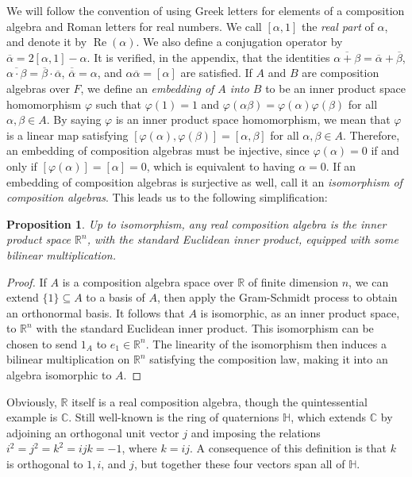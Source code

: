 \documentclass[10pt]{amsart}
\newcommand{\R}{\mathbb{R}}
\newcommand{\C}{\mathbb{C}}
\renewcommand{\H}{\mathbb{H}}
\DeclareMathOperator*{\re}{Re}
\renewcommand{\bar}{\overline}
\newcommand{\norm}[1]{\left[#1\right]}
\newtheorem{prop}[thm]{Proposition}
\begin{document}
We will follow the convention of using Greek letters for elements of a composition algebra and Roman letters for real numbers.  We call $\norm{\alpha,1}$ the \emph{real part} of $\alpha$, and denote it by $\re(\alpha)$.  We also define a conjugation operator by $\bar{\alpha} = 2[\alpha,1] - \alpha$.  It is verified, in the appendix, that the identities $\bar{\alpha + \beta} = \bar{\alpha} + \bar{\beta}$, $\bar{\alpha \cdot \beta} = \bar{\beta} \cdot \bar{\alpha}$, $\bar{\bar{\alpha}} = \alpha$, and $\alpha \bar{\alpha} = \norm{\alpha}$ are satisfied.  If $A$ and $B$ are composition algebras over $F$, we define an \emph{embedding of $A$ into $B$} to be an inner product space homomorphism $\varphi$ such that $\varphi(1) = 1$ and $\varphi(\alpha\beta) = \varphi(\alpha)\varphi(\beta)$ for all $\alpha, \beta \in A$.  By saying $\varphi$ is an inner product space homomorphism, we mean that $\varphi$ is a linear map satisfying $\norm{\varphi(\alpha),\varphi(\beta)} = \norm{\alpha,\beta}$ for all $\alpha, \beta \in A$.  Therefore, an embedding of composition algebras must be injective, since $\varphi(\alpha) = 0$ if and only if $\norm{\varphi(\alpha)} = \norm{\alpha} = 0$, which is equivalent to having $\alpha = 0$.  If an embedding of composition algebras is surjective as well, call it an \emph{isomorphism of composition algebras}.  This leads us to the following simplification:

\begin{prop} \label{prop:R^n}
\normalfont
Up to isomorphism, any real composition algebra is the inner product space $\R^n$, with the standard Euclidean inner product, equipped with some bilinear multiplication.
\end{prop}

\begin{proof}
If $A$ is a composition algebra space over $\R$ of finite dimension $n$, we can extend $\{1\} \subseteq A$ to a basis of $A$, then apply the Gram-Schmidt process to obtain an orthonormal basis.  It follows that $A$ is isomorphic, as an inner product space, to $\R^n$ with the standard Euclidean inner product.  This isomorphism can be chosen to send $1_A$ to $e_1 \in \R^n$.  The linearity of the isomorphism then induces a bilinear multiplication on $\R^n$ satisfying the composition law, making it into an algebra isomorphic to $A$.
\end{proof}


Obviously, $\R$ itself is a real composition algebra, though the quintessential example is $\C$.  Still well-known is the ring of quaternions $\H$, which extends $\C$ by adjoining an orthogonal unit vector $j$ and imposing the relations $i^2 = j^2 = k^2 = ijk = -1$, where $k = ij$.  A consequence of this definition is that $k$ is orthogonal to $1,i$, and $j$, but together these four vectors span all of $\H$.
\end{document}
